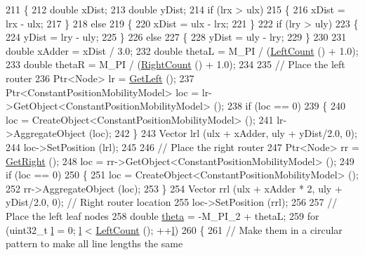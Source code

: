 \begin{DoxyCode}
211 \{
212   \textcolor{keywordtype}{double} xDist;
213   \textcolor{keywordtype}{double} yDist;
214   \textcolor{keywordflow}{if} (lrx > ulx)
215     \{
216       xDist = lrx - ulx;
217     \}
218   \textcolor{keywordflow}{else}
219     \{
220       xDist = ulx - lrx;
221     \}
222   \textcolor{keywordflow}{if} (lry > uly)
223     \{
224       yDist = lry - uly;
225     \}
226   \textcolor{keywordflow}{else}
227     \{
228       yDist = uly - lry;
229     \}
230 
231   \textcolor{keywordtype}{double} xAdder = xDist / 3.0;
232   \textcolor{keywordtype}{double}  thetaL = M\_PI / (\hyperlink{classns3_1_1PointToPointDumbbellHelper_a6a1fd00ea7d546fc3b45054eb3144a51}{LeftCount} () + 1.0);
233   \textcolor{keywordtype}{double}  thetaR = M\_PI / (\hyperlink{classns3_1_1PointToPointDumbbellHelper_ae70148ba832410e8a7a030a323102d97}{RightCount} () + 1.0);
234 
235   \textcolor{comment}{// Place the left router}
236   Ptr<Node> lr = \hyperlink{classns3_1_1PointToPointDumbbellHelper_a8933bfa2a6f97c2be38a4808e5fa9ec4}{GetLeft} ();
237   Ptr<ConstantPositionMobilityModel> loc = lr->GetObject<ConstantPositionMobilityModel> ();
238   \textcolor{keywordflow}{if} (loc == 0)
239     \{
240       loc = CreateObject<ConstantPositionMobilityModel> ();
241       lr->AggregateObject (loc);
242     \}
243   Vector lrl (ulx + xAdder, uly + yDist/2.0, 0);
244   loc->SetPosition (lrl);
245 
246   \textcolor{comment}{// Place the right router}
247   Ptr<Node> rr = \hyperlink{classns3_1_1PointToPointDumbbellHelper_aa68edfbee375a687aa1dd98a9a6c238b}{GetRight} ();
248   loc = rr->GetObject<ConstantPositionMobilityModel> ();
249   \textcolor{keywordflow}{if} (loc == 0)
250     \{
251       loc = CreateObject<ConstantPositionMobilityModel> ();
252       rr->AggregateObject (loc);
253     \}
254   Vector rrl (ulx + xAdder * 2, uly + yDist/2.0, 0); \textcolor{comment}{// Right router location}
255   loc->SetPosition (rrl);
256 
257   \textcolor{comment}{// Place the left leaf nodes}
258   \textcolor{keywordtype}{double} \hyperlink{loss__ITU1411__NLOS__over__rooftop_8m_a68ce9834ce390774bce9c89b78d5bf79}{theta} = -M\_PI\_2 + thetaL;
259   \textcolor{keywordflow}{for} (uint32\_t \hyperlink{buildings__pathloss_8m_a5b54c0a045f179bcbbbc9abcb8b5cd4c}{l} = 0; \hyperlink{buildings__pathloss_8m_a5b54c0a045f179bcbbbc9abcb8b5cd4c}{l} < \hyperlink{classns3_1_1PointToPointDumbbellHelper_a6a1fd00ea7d546fc3b45054eb3144a51}{LeftCount} (); ++\hyperlink{buildings__pathloss_8m_a5b54c0a045f179bcbbbc9abcb8b5cd4c}{l})
260     \{
261       \textcolor{comment}{// Make them in a circular pattern to make all line lengths the same}

\end{DoxyCode}
